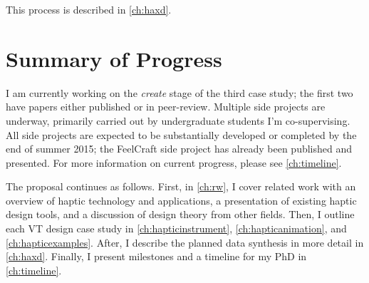 This process is described in \autoref{ch:haxd}.


\section{Summary of Progress}

I am currently working on the \emph{create} stage of the third case study; the first two have papers either published or in peer-review.
Multiple side projects are underway, primarily  carried out by undergraduate students I'm co-supervising.
All side projects are expected to be substantially developed or completed by the end of summer 2015; the FeelCraft side project has already been published and presented.
For more information on current progress, please see \autoref{ch:timeline}.


The proposal continues as follows.
First, in \autoref{ch:rw}, I cover related work with an overview of haptic technology and applications, a presentation of existing haptic design tools, and a discussion of design theory from other fields.
Then, I outline each VT design case study in \autoref{ch:hapticinstrument},  \autoref{ch:hapticanimation}, and \autoref{ch:hapticexamples}.
After, I describe the planned data synthesis in more detail in \autoref{ch:haxd}.
Finally, I present milestones and a timeline for my PhD in \autoref{ch:timeline}.


%
%
\endinput

Any text after an \endinput is ignored.
You could put scraps here or things in progress.
